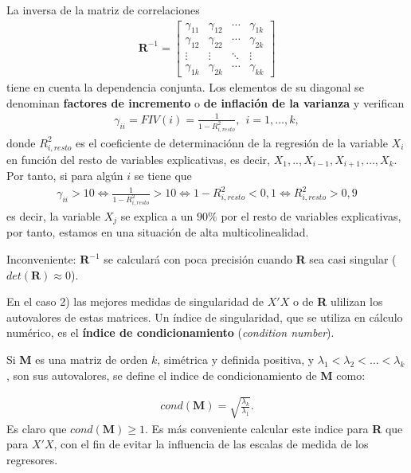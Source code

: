 La inversa de la matriz de correlaciones
\begin{align*}
    \textbf{R}^{-1} = \begin{bmatrix}
                          \gamma_{11} & \gamma_{12} & \cdots & \gamma_{1k} \\
                          \gamma_{12} & \gamma_{22} & \cdots & \gamma_{2k} \\
                          \vdots      & \vdots      & \ddots & \vdots      \\
                          \gamma_{1k} & \gamma_{2k} & \cdots & \gamma_{kk}
                      \end{bmatrix}
\end{align*}
tiene en cuenta la dependencia conjunta. Los elementos de su diagonal se denominan \textbf{factores de incremento} o \textbf{de inflación de la varianza} y verifican
\begin{align*}
    \gamma_{ii} = FIV(i) = \frac{1}{1 - R^2_{i,resto}}, \ \ i = 1,\ldots,k,
\end{align*}
donde $R^2_{i,resto}$ es el coeficiente de determinaciónn de la regresión de la variable $X_i$ en función del resto de variables explicativas, es decir, $X_1,..,X_{i-1},X_{i+1},\ldots,X_k$. Por tanto, si para algún $i$ se tiene que
\begin{align*}
    \gamma_{ii} > 10 \Longleftrightarrow \frac{1}{1-R^2_{i,resto}} > 10 \Longleftrightarrow 1- R^2_{i,resto} < 0,1 \Longleftrightarrow R^2_{i,resto} > 0,9
\end{align*}
es decir, la variable $X_j$ se explica a un $90\%$ por el resto de variables explicativas, por tanto, estamos en una situación de alta multicolinealidad.

Inconveniente: $\textbf{R}^{-1}$ se calculará con poca precisión cuando \textbf{R} sea casi singular ($det(\textbf{R}) \approx 0$).

En el caso 2) las mejores medidas de singularidad de $X'X$ o de \textbf{R} ulilizan los autovalores de estas matrices. Un índice de singularidad, que se utiliza en cálculo numérico, es el \textbf{índice de condicionamiento} (\textit{condition number}).

Si \textbf{M} es una matriz de orden $k$, simétrica y definida positiva, y $\lambda_1 < \lambda_2 < \ldots < \lambda_k$, son sus autovalores, se define el indice de condicionamiento de \textbf{M} como:

\begin{align*}
    cond(\textbf{M}) = \sqrt{\frac{\lambda_k}{\lambda_1}}.
\end{align*}
Es claro que $cond(\textbf{M}) \ge 1$. Es más conveniente calcular este indice para \textbf{R} que para $X'X$, con el fin de evitar la influencia de las escalas de medida de los regresores.

